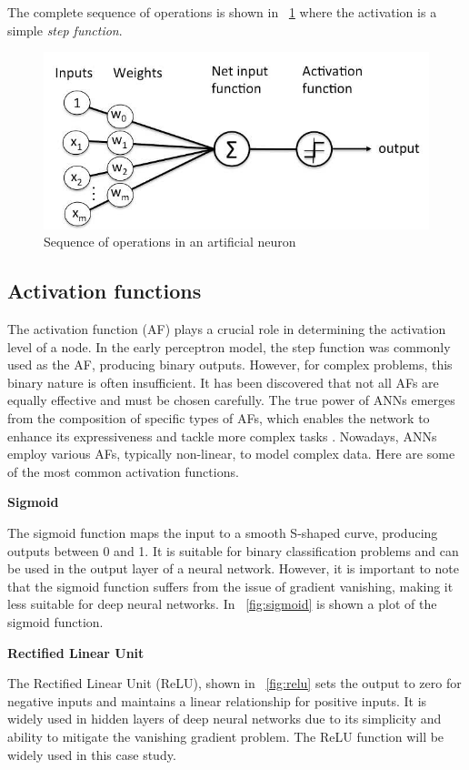 The complete sequence of operations is shown in \Fig~\ref{fig:percep_full} where the activation is a simple \textit{step function}.

\begin{figure}[h]
	\centering
	\includegraphics[width=0.5\linewidth]{ImageFiles/NeuralNetworks/percep_full}
	\caption{Sequence of operations in an artificial neuron \cite{WPBGP}}
	\label{fig:percep_full}
\end{figure}

\subsection{Activation functions}

The activation function (AF) plays a crucial role in determining the activation level of a node. In the early perceptron model, the step function was commonly used as the AF, producing binary outputs. However, for complex problems, this binary nature is often insufficient. It has been discovered that not all AFs are equally effective and must be chosen carefully.
The true power of ANNs emerges from the composition of specific types of AFs, which enables the network to enhance its expressiveness and tackle more complex tasks \cite{aggarwal2018neural}. Nowadays, ANNs employ various AFs, typically non-linear, to model complex data. Here are some of the most common activation functions.

\vspace{0.2cm}
\textbf{Sigmoid}

The sigmoid function maps the input to a smooth S-shaped curve, producing outputs between 0 and 1. It is suitable for binary classification problems and can be used in the output layer of a neural network. However, it is important to note that the sigmoid function suffers from the issue of gradient vanishing, making it less suitable for deep neural networks. In \Fig~\ref{fig:sigmoid} is shown a plot of the sigmoid function.

\vspace{0.2cm}
\textbf{Rectified Linear Unit}

The Rectified Linear Unit (ReLU), shown in \Fig~\ref{fig:relu} sets the output to zero for negative inputs and maintains a linear relationship for positive inputs. It is widely used in hidden layers of deep neural networks due to its simplicity and ability to mitigate the vanishing gradient problem. The ReLU function will be widely used in this case study.

